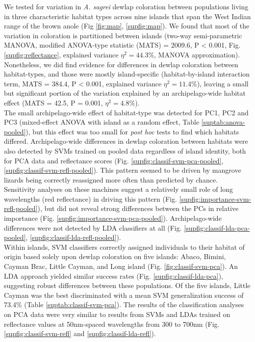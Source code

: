 
We tested for variation in \textit{A. sagrei} dewlap coloration between populations living in three characteristic habitat types across nine islands that span the West Indian range of the brown anole (Fig \ref{fig:map}, \ref{supfig:map}). We found that most of the variation in coloration is partitioned between islands (two-way semi-parametric MANOVA, modified ANOVA-type statistic (MATS) = 2009.6, P < 0.001, Fig. \ref{supfig:reflectance}, explained variance $\eta^2 = 44.3$\%, MANOVA approximation). Nonetheless, we did find evidence for differences in dewlap coloration between habitat-types, and those were mostly island-specific (habitat-by-island interaction term, MATS = 384.4, P < 0.001, explained variance $\eta^2 = 11.4$\%), leaving a small but significant portion of the variation explained by an archipelago-wide habitat effect (MATS = 42.5, P = 0.001, $\eta^2 = 4.8$\%).\\

The small archipelago-wide effect of habitat-type was detected for PC1, PC2 and PC3 (mixed-effect ANOVA with island as a random effect, Table \ref{suptab:anova-pooled}), but this effect was too small for \textit{post hoc} tests to find which habitats differed. Archipelago-wide differences in dewlap coloration between habitats were also detected by SVMs trained on pooled data regardless of island identity, both for PCA data and reflectance scores (Fig. \ref{supfig:classif-svm-pca-pooled}, \ref{supfig:classif-svm-refl-pooled}). This pattern seemed to be driven by mangrove lizards being correctly reassigned more often than predicted by chance. Sensitivity analyses on these machines suggest a relatively small role of long wavelengths (red reflectance) in driving this pattern (Fig. \ref{supfig:importance-svm-refl-pooled}), but did not reveal strong differences between the PCs in relative importance (Fig. \ref{supfig:importance-svm-pca-pooled}).  Archipelago-wide differences were not detected by LDA classifiers at all (Fig. \ref{supfig:classif-lda-pca-pooled}, \ref{supfig:classif-lda-refl-pooled}).\\ %

Within islands, SVM classifiers correctly assigned individuals to their habitat of origin based solely upon dewlap coloration on five islands: Abaco, Bimini, Cayman Brac, Little Cayman, and Long island (Fig. \ref{fig:classif-svm-pca}). An LDA approach yielded similar success rates (Fig. \ref{supfig:classif-lda-pca}), suggesting robust differences between these populations. Of the five islands, Little Cayman was the best discriminated with a mean SVM generalization success of 73.4\% (Table \ref{suptab:classif-svm-pca}). The results of the classification analyses on PCA data were very similar to results from SVMs and LDAs trained on reflectance values at 50nm-spaced wavelengths from 300 to 700nm (Fig. \ref{supfig:classif-svm-refl} and \ref{supfig:classif-lda-refl}).\\

